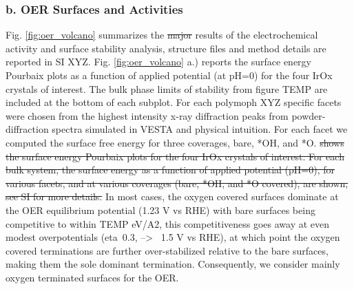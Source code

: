 \subsubsection{b. OER Surfaces and Activities}

Fig. \ref{fig:oer_volcano} summarizes the \sout{major} results of the electrochemical activity and surface stability analysis, structure files and method details are reported in SI XYZ.
%
Fig. \ref{fig:oer_volcano} a.) reports the surface energy Pourbaix plots as a function of applied potential (at pH=0) for the four IrOx crystals of interest. The bulk phase limits of stability from figure TEMP are included at the bottom of each subplot.  For each polymoph XYZ specific facets were chosen from the highest intensity x-ray diffraction peaks from powder-diffraction spectra simulated in VESTA and physical intuition. For each facet we computed the surface free energy for three coverages, bare, *OH, and *O.
\sout{shows the surface energy Pourbaix plots for the four IrOx crystals of interest. For each bulk system, the surface energy as a function of applied potential (pH=0), for various facets, and at various coverages (bare, *OH, and *O covered), are shown, see SI for more details.}
%
In most cases, the oxygen covered surfaces dominate at the OER equilibrium potential (1.23 V vs RHE) with bare surfaces being competitive to within TEMP eV/A2,
this competitiveness goes away at even modest overpotentials (eta~0.3, --> ~1.5 V vs RHE),
at which point the oxygen covered terminations are further over-stabilized relative to the bare surfaces,
making them the sole dominant termination. Consequently, we consider mainly  oxygen terminated surfaces for the OER.\\
%

